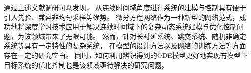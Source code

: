 通过上述文献调研可以发现，
从连续时间域角度进行系统的建模与控制具有便于引入先验、兼容非均匀采样等优势。
微分方程网络作为一种新型的网络范式，成功地将深度学习技术应用于解决连续时间域下的复杂动态系统建模与优化控制问题，为该领域带来了无限可能。
然而，针对长时延系统、跳变系统、随机非确定系统等具有一定特性的复杂系统，
在模型的设计方法以及网络的训练方法等方面存在一定的研究空白。
同时，如何利用辨识得到的ODE模型更好地实现有模型下目标系统的优化控制也是该领域亟待解决的研究问题。
